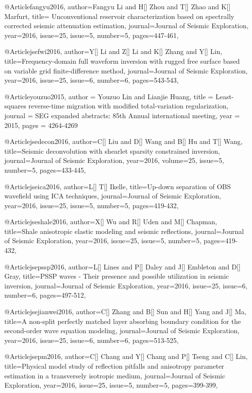 @Article{fangyu2016,
  author={Fangyu Li and H[] Zhou and T[] Zhao and K[] Marfurt},
  title={ Unconventional reservoir characterization based on spectrally corrected seismic attenuation estimation},
  journal={Journal of Seismic Exploration},
  year=2016,
  issue=25,
  issue=5,
  number=5,
  pages={447-461},
}

@Article{jsefwi2016,
  author={Y[] Li and Z[] Li and K[] Zhang and Y[] Lin},
  title={Frequency-domain full waveform inversion with rugged free surface based on variable grid finite-difference method},
  journal={Journal of Seismic Exploration},
  year=2016,
  issue=25,
  issue=6,
  number=6,
  pages={543-543},
}

@Article{youzuo2015,
  author = 	 {Youzuo Lin and Lianjie Huang},
  title = 	 {Least-squares reverse-time migration with modified total-variation regularization},
  journal = 	 {SEG expanded abstracts: 85th Annual international meeting},
  year = 	 2015,
  pages =	 {4264-4269}
}


@Article{jsedecon2016,
  author={C[] Liu and D[] Wang and B[] Hu and T[] Wang},
  title={Seismic deconvolution with shearlet sparsity constrained inversion},
  journal={Journal of Seismic Exploration},
  year=2016,
  volume=25,
  issue=5,
  number=5,
  pages={433-445},
}

@Article{jseica2016,
  author={L[] T[] Ikelle},
  title={Up-down separation of OBS wavefield using ICA techniques},
  journal={Journal of Seismic Exploration},
  year=2016,
  issue=25,
  issue=5,
  number=5,
  pages={419-432},
}

@Article{jseshale2016,
  author={X[] Wu and R[] Uden and M[] Chapman},
  title={Shale anisotropic elastic modeling and seismic reflections},
  journal={Journal of Seismic Exploration},
  year=2016,
  issue=25,
  issue=5,
  number=5,
  pages={419-432},
}


@Article{jsepssp2016,
  author={L[] Lines and P[] Daley and J[] Embleton and D[] Gray},
  title={PSSP waves - Their presence and possible utilization in seismic inversion},
  journal={Journal of Seismic Exploration},
  year=2016,
  issue=25,
  issue=6,
  number=6,
  pages={497-512},
}


@Article{jsejianwei2016,
  author={C[] Zhang and B[] Sun and H[] Yang and J[] Ma},
  title={A non-split perfectly matched layer absorbing boundary condition for the second-order wave equation modeling},
  journal={Journal of Seismic Exploration},
  year=2016,
  issue=25,
  issue=6,
  number=6,
  pages={513-525},
}

@Article{jsepm2016,
  author={C[] Chang and Y[] Chang and P[] Tseng and C[] Lin},
  title={Physical model study of reflection pitfalls and anisotropy parameter estimation in a transversely isotropic medium},
  journal={Journal of Seismic Exploration},
  year=2016,
  issue=25,
  issue=5,
  number=5,
  pages={399-399},
}

